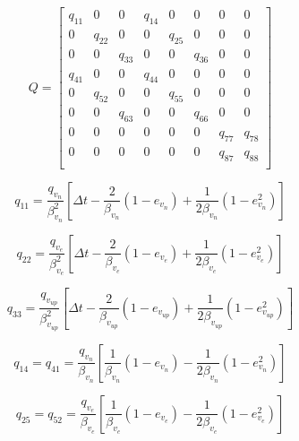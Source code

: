 \documentclass[11pt,letterpaper]{article}
\begin{document}
\begin{equation} \label{eq:Q}
Q = \left[
\begin{array}{cccccccc}
q_{11} & 0      &     0  & q_{14} &      0 &      0 &      0 &      0  \\
0      & q_{22} &     0  &      0 & q_{25} &      0 &      0 &      0  \\
0      &      0 & q_{33} &      0 &      0 & q_{36} &      0 &      0  \\
q_{41} &      0 &     0  & q_{44} &      0 &      0 &      0 &      0  \\
0      & q_{52} &     0  &      0 & q_{55} &      0 &      0 &      0  \\
0      &      0 & q_{63} &      0 &      0 & q_{66} &      0 &      0  \\
0      &      0 &     0  &      0 &      0 &      0 & q_{77} & q_{78}  \\
0      &      0 &     0  &      0 &      0 &      0 & q_{87} & q_{88}  \\
\end{array}
\right]
\end{equation}

\begin{equation} \label{eq:q11}
q_{11} = \frac{q_{v_n}}{\beta_{v_n}^2} [\Delta t - \frac{2}{\beta_{v_n}}(1 - e_{v_n}) + \frac{1}{2 \beta_{v_n}}(1 - e_{v_n}^2)]
\end{equation}

\begin{equation} \label{eq:q22}
q_{22} = \frac{q_{v_e}}{\beta_{v_e}^2} [\Delta t - \frac{2}{\beta_{v_e}}(1 - e_{v_e}) + \frac{1}{2 \beta_{v_e}}(1 - e_{v_e}^2)]
\end{equation}

\begin{equation} \label{eq:q33}
q_{33} = \frac{q_{v_{up}}}{\beta_{v_{up}}^2} [\Delta t - \frac{2}{\beta_{v_{up}}}(1 - e_{v_{up}}) + \frac{1}{2 \beta_{v_{up}}}(1 - e_{v_{up}}^2)]
\end{equation}


\begin{equation} \label{eq:q14}
q_{14} = q_{41} = \frac{q_{v_n}}{\beta_{v_n}} [ \frac{1}{\beta_{v_n}}(1 - e_{v_n}) - \frac{1}{2 \beta_{v_n}}(1 - e_{v_n}^2)]
\end{equation}

\begin{equation} \label{eq:q25}
q_{25} = q_{52} = \frac{q_{v_e}}{\beta_{v_e}} [ \frac{1}{\beta_{v_e}}(1 - e_{v_e}) - \frac{1}{2 \beta_{v_e}}(1 - e_{v_e}^2)]
\end{equation}
\end{document}
